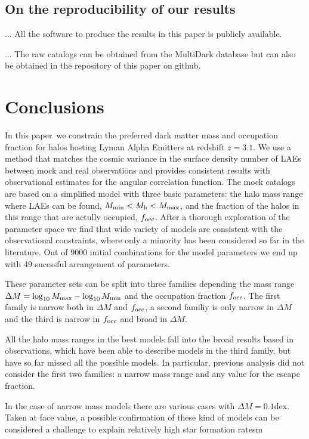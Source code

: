 \documentclass[usenatbib]{mn2e}
\newcommand{\documentname}{paper~}
\begin{document}
\subsection{On the reproducibility of our results}

... All the software to produce the results in this paper is publicly
available. 

... The raw catalogs can be obtained from the MultiDark database but
can also be obtained in the repository of this paper on github.

\section{Conclusions}

In this \documentname we constrain the preferred dark matter mass
and occupation fraction for halos hosting Lyman Alpha Emitters at
redshift $z=3.1$. We use a method that matches the cosmic variance in the surface
density number of LAEs between mock and real observations and provides
consistent results with observational estimates for the angular
correlation function. The mock catalogs are based on a simplified
model with three basic parameters: the halo mass range where LAEs can
be found, $M_{\rm   min}<M_{\rm h}<M_{\rm   max}$, and the fraction of
the halos in this range that are actully occupied, $f_{\rm occ}$. After
a thorough exploration of the parameter space we find that wide
variety of models are consistent with the observational constraints,
where only a minority has been considered so far in the
literature. Out of $9000$ initial combinations for the model
parameters we end up with $49$ sucessful arrangement of parameters.

These parameter sets can be split into three families depending the mass range
$\Delta M=\log_{10}M_{\rm max} - \log_{10}M_{\rm min}$ and the
occupation fraction $f_{\rm occ}$. The first family is narrow both in
$\Delta M$ and $f_{\rm occ}$, a second familiy is only narrow in
$\Delta M$ and the third is narrow in $f_{\rm occ}$ and broad in
$\Delta M$. 

All the halo mass ranges in the best models fall into the broad
results based in observations, which have been able to describe models
in the third family, but have so far missed all the possible
models. In particular, previous analysis did not consider the first
two families: a narrow mass range and any value for the escape fraction.

In the case of narrow mass models there are various cases with $\Delta
M=0.1$dex. Taken at face value, a possible confirmation of these kind of models
can be considered a challenge to explain relatively high star
formation ratesm
\end{document}
